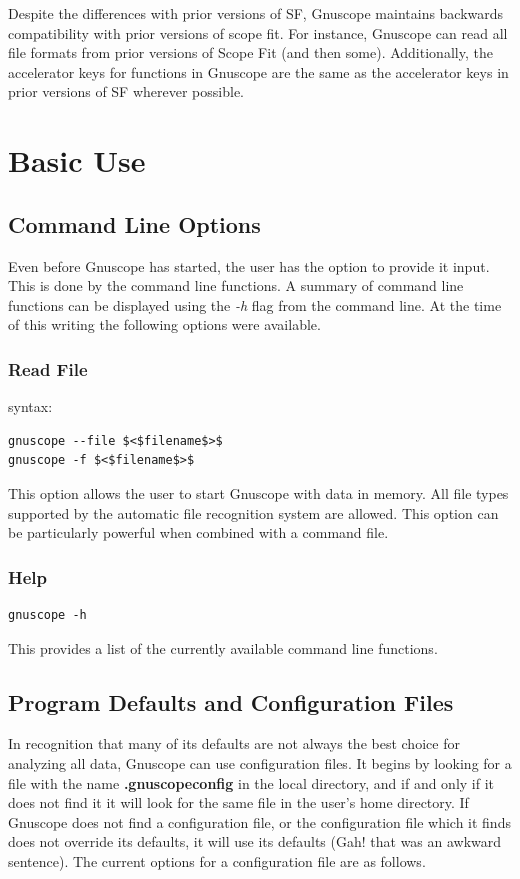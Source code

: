 Despite the differences with prior versions of SF, Gnuscope maintains backwards compatibility with prior versions of scope fit.  For instance, Gnuscope can read all file formats from prior versions of Scope Fit (and then some).  Additionally, the accelerator keys for functions in Gnuscope are the same as the accelerator keys in prior versions of SF wherever possible.  

\chapter{Basic Use}
\section{Command Line Options}

Even before Gnuscope has started, the user has the option to provide it input.  This is done by the command line functions.  A summary of command line functions can be displayed using the {\it -h} flag from the command line.  At the time of this writing the following options were available.

\subsection{Read File}

syntax:
\begin{verbatim}
gnuscope --file $<$filename$>$
gnuscope -f $<$filename$>$
\end{verbatim}
This option allows the user to start Gnuscope with data in memory.  All file types supported by the automatic file recognition system are allowed.  This option can be particularly powerful when combined with a command file.
\subsection{Help}

\begin{verbatim}
gnuscope -h
\end{verbatim}
This provides a list of the currently available command line functions.

\section{Program Defaults and Configuration Files}

In recognition that many of its defaults are not always the best choice for analyzing all data, Gnuscope can use configuration files.  It begins by looking for a file with the name {\bf .gnuscopeconfig} in the local directory, and if and only if it does not find it it will look for the same file in the user's home directory.  If Gnuscope does not find a configuration file, or the configuration file which it finds does not override its defaults, it will use its defaults (Gah! that was an awkward sentence).  The current options for a configuration file are as follows.

